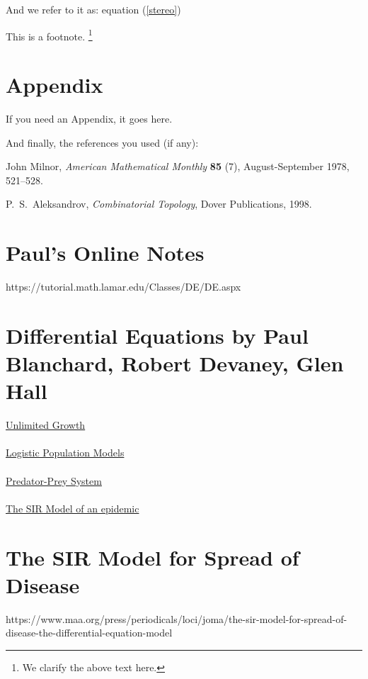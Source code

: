 \documentclass{amsart}
\theoremstyle{definition}
\numberwithin{equation}{section}
\begin{document}
\begin{sansmath}
  And we refer to it as: equation (\ref{stereo})

This is a footnote.
    \footnote{We clarify the above text here.}

    \medskip


\section{Appendix}

If you need an Appendix, it goes here.

\bigskip



And finally, the references you used (if any):


\begin{thebibliography}{12}

John Milnor, {\it
 American Mathematical Monthly}
    {\bf 85} (7), August-September 1978, 521--528.

 \smallskip

    P.~S.~Aleksandrov, {\it Combinatorial Topology},
    Dover Publications, 1998.


\end{thebibliography}

\newpage
\section{Paul's Online Notes}
https://tutorial.math.lamar.edu/Classes/DE/DE.aspx\\
\lipsum[0-2]

\section{Differential Equations by Paul Blanchard, Robert Devaney, Glen Hall}
\underline{Unlimited Growth}\\ %
\lipsum[2-4]\\
\underline{Logistic Population Models}\\ %
\lipsum[4-6]\\
\underline{Predator-Prey System}\\ %
\lipsum[6-8]\\
\underline{The SIR Model of an epidemic}\\ %
\lipsum[8-10]

\section{The SIR Model for Spread of Disease}
https://www.maa.org/press/periodicals/loci/joma/the-sir-model-for-spread-of-disease-the-differential-equation-model\\
\lipsum[0-2]


\end{sansmath}
\end{document}
